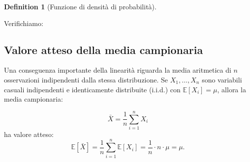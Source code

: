 \documentclass[
  letterpaper,
  DIV=11,
  numbers=noendperiod,
  oneside]{scrreprt}
\newenvironment{Shaded}{\begin{snugshade}}{\end{snugshade}}
\newcommand{\AttributeTok}[1]{\textcolor[rgb]{0.40,0.45,0.13}{#1}}
\newcommand{\CommentTok}[1]{\textcolor[rgb]{0.37,0.37,0.37}{#1}}
\newcommand{\DecValTok}[1]{\textcolor[rgb]{0.68,0.00,0.00}{#1}}
\newcommand{\FloatTok}[1]{\textcolor[rgb]{0.68,0.00,0.00}{#1}}
\newcommand{\FunctionTok}[1]{\textcolor[rgb]{0.28,0.35,0.67}{#1}}
\newcommand{\NormalTok}[1]{\textcolor[rgb]{0.00,0.23,0.31}{#1}}
\newcommand{\OtherTok}[1]{\textcolor[rgb]{0.00,0.23,0.31}{#1}}
\newcommand{\SpecialCharTok}[1]{\textcolor[rgb]{0.37,0.37,0.37}{#1}}
\newcommand{\StringTok}[1]{\textcolor[rgb]{0.13,0.47,0.30}{#1}}
\theoremstyle{definition}
\theoremstyle{plain}
\theoremstyle{definition}
\newtheorem{definition}{Definition}[chapter]
\theoremstyle{remark}
\begin{document}
\begin{definition}[Funzione di densità di
probabilità]
\begin{tcolorbox}
Verifichiamo:

\begin{Shaded}
\end{Shaded}

\end{tcolorbox}

\subsection{Valore atteso della media
campionaria}\label{valore-atteso-della-media-campionaria}

Una conseguenza importante della linearità riguarda la media aritmetica
di \(n\) osservazioni indipendenti dalla stessa distribuzione. Se
\(X_1, \ldots, X_n\) sono variabili casuali indipendenti e identicamente
distribuite (i.i.d.) con \(\mathbb{E}[X_i] = \mu\), allora la media
campionaria:

\[
\bar{X} = \frac{1}{n}\sum_{i=1}^{n} X_i
\] ha valore atteso: \[
\mathbb{E}[\bar{X}] = \frac{1}{n}\sum_{i=1}^{n} \mathbb{E}[X_i] = \frac{1}{n} \cdot n \cdot \mu = \mu.
\]


\end{definition}
\end{document}
